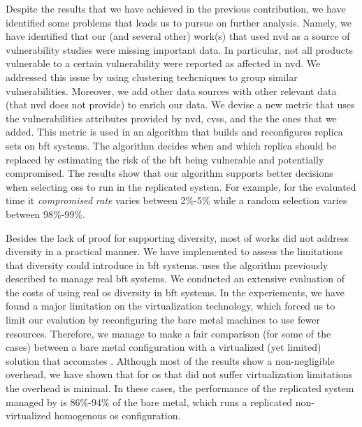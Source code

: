 Despite the results that we have achieved in the previous contribution, we have identified some problems that leads us to pursue on further analysis.
Namely, we have identified that our (and several other) work(s) that used \gls{nvd} as a source of vulnerability studies were missing important data. 
In particular, not all products vulnerable to a certain vulnerability were reported as affected in \gls{nvd}.
We addressed this issue by using clustering techcniques to group similar vulnerabilities.
Moreover, we add other data sources with other relevant data (that \gls{nvd} does not provide) to enrich our data.
We devise a new metric that uses the vulnerabilities attributes provided by \gls{nvd}, \gls{cvss}, and the the ones that we added. 
This metric is used in an algorithm that builds and reconfigures replica sets on \gls{bft} systems.
The algorithm decides when and which replica should be replaced by estimating the risk of the \gls{bft} being vulnerable and potentially compromised.
The results show that our algorithm supports better decisions when selecting \glspl{os} to run in the replicated system. 
For example, for the evaluated time it \emph{compromised rate} varies between 2\%-5\% while a random selection varies between 98\%-99\%.
 

Besides the lack of proof for supporting diversity, most of works did not address diversity in a practical manner.
We have implemented \system to assess the limitations that diversity could introduce in \gls{bft} systems.
\system uses the algorithm previously described to manage real \gls{bft} systems. 
We conducted an extensive evaluation of the costs of using real \gls{os} diversity in \gls{bft} systems.
In the experiements, we have found a major limitation on the virtualization technology, which forced us to limit our evalution by reconfiguring the bare metal machines to use fewer resources.
Therefore, we manage to make a fair comparison (for some of the cases) between a bare metal configuration with a virtualized (yet limited) solution that accomates \system.
Although most of the results show a non-negligible overhead, we have shown that for \gls{os} that did not suffer virtualization limitations the overhead is minimal.
In these cases, the performance of the replicated system managed by \system is 86\%-94\% of the bare metal, which runs a replicated non-virtualized homogenous \gls{os} configuration.

